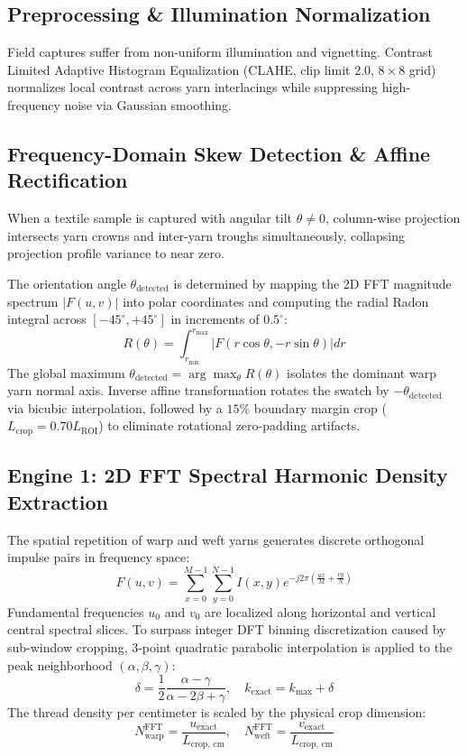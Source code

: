 \documentclass[11pt,a4paper]{article}
\begin{document}
\subsection{Preprocessing \& Illumination Normalization}
Field captures suffer from non-uniform illumination and vignetting. Contrast Limited Adaptive Histogram Equalization (CLAHE, clip limit 2.0, $8\times 8$ grid) normalizes local contrast across yarn interlacings while suppressing high-frequency noise via Gaussian smoothing.

\subsection{Frequency-Domain Skew Detection \& Affine Rectification}
When a textile sample is captured with angular tilt $\theta \ne 0$, column-wise projection intersects yarn crowns and inter-yarn troughs simultaneously, collapsing projection profile variance to near zero. 

The orientation angle $\theta_{\text{detected}}$ is determined by mapping the 2D FFT magnitude spectrum $|F(u, v)|$ into polar coordinates and computing the radial Radon integral across $[-45^\circ, +45^\circ]$ in increments of $0.5^\circ$:
\begin{equation}
    R(\theta) = \int_{r_{\min}}^{r_{\max}} \left| F\left( r \cos\theta, -r \sin\theta \right) \right| dr
\end{equation}
The global maximum $\theta_{\text{detected}} = \arg\max_\theta R(\theta)$ isolates the dominant warp yarn normal axis. Inverse affine transformation rotates the swatch by $-\theta_{\text{detected}}$ via bicubic interpolation, followed by a $15\%$ boundary margin crop ($L_{\text{crop}} = 0.70 L_{\text{ROI}}$) to eliminate rotational zero-padding artifacts.

\subsection{Engine 1: 2D FFT Spectral Harmonic Density Extraction}
The spatial repetition of warp and weft yarns generates discrete orthogonal impulse pairs in frequency space:
\begin{equation}
    F(u, v) = \sum_{x=0}^{M-1} \sum_{y=0}^{N-1} I(x, y) e^{-j 2\pi \left(\frac{ux}{M} + \frac{vy}{N}\right)}
\end{equation}
Fundamental frequencies $u_0$ and $v_0$ are localized along horizontal and vertical central spectral slices. To surpass integer DFT binning discretization caused by sub-window cropping, 3-point quadratic parabolic interpolation is applied to the peak neighborhood $(\alpha, \beta, \gamma)$:
\begin{equation}
    \delta = \frac{1}{2} \frac{\alpha - \gamma}{\alpha - 2\beta + \gamma}, \quad k_{\text{exact}} = k_{\max} + \delta
\end{equation}
The thread density per centimeter is scaled by the physical crop dimension:
\begin{equation}
    N_{\text{warp}}^{\text{FFT}} = \frac{u_{\text{exact}}}{L_{\text{crop, cm}}}, \quad N_{\text{weft}}^{\text{FFT}} = \frac{v_{\text{exact}}}{L_{\text{crop, cm}}}
\end{equation}
\end{document}
